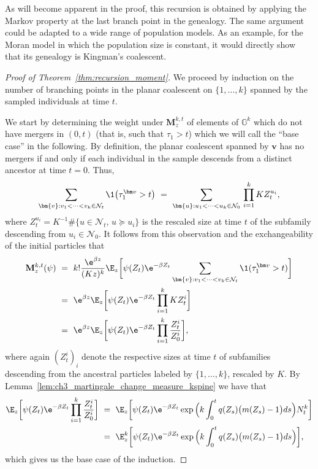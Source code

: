 \begin{refsegment}
\begin{rem}
    As will become apparent in the proof, this recursion is
    obtained by applying the Markov property at the last branch point in
    the genealogy. The same argument could be adapted to a wide range of
    population models. As an example, for the Moran model in which the
    population size is constant, it would directly show that  its
    genealogy is Kingman's coalescent.
\end{rem}

\begin{proof}[Proof of Theorem~\ref{thm:recursion_moment}]
We proceed by induction on the number of branching points in the planar
coalescent on $\{1,\ldots, k\}$ spanned by the sampled individuals at time $t$.

We start by
determining the weight under $\mathbf{M}^{k,t}_{z}$ of elements of $\mathbb{G}^k$ which do not have mergers in $(0,t)$ (that is, such that
$\tau_1>t$) which we will call the ``base case'' in the following. By
definition, the planar coalescent spanned by $\bm v$ has no mergers if
and only if each individual in the sample descends from a distinct
ancestor at time $t=0$. Thus,
\begin{equation*}
    \sum_{\bm{v}:v_1<\cdots < v_k \in \mathcal{N}_t}\1\big( \tau_1^{\bm v}>t\big)\ =\ \sum_{\bm{u}:u_1<\cdots<u_k\in\mathcal{N}_0}\, \prod_{i=1}^k K Z^{u_i}_t ,
\end{equation*}
where $Z^{u_i}_t=K^{-1}\#\big\{ u\in \mathcal{N}_t,\,u\succcurlyeq u_i
\big\}$ is the rescaled size at time $t$ of the subfamily descending from
$u_i\in\mathcal{N}_0$. It follows from this observation and the
exchangeability of the initial particles that
\begin{equation*}
    \begin{aligned}
\mathbf{M}^{k,t}_{z}(\psi)\ &=\ k!\frac{\e^{\beta z}}{(Kz)^k}\E_{z}\bigg[ \psi(Z_t) \e^{-\beta Z_t}\sum_{\bm{v}:v_1<\cdots < v_k \in \mathcal{N}_t}\1( \tau_1^{\bm v}>t)\bigg]\\
&=\  \e^{\beta z}\E_{z}\bigg[\psi(Z_t)\e^{-\beta Z_t}\prod_{i=1}^k K Z^{i}_t\bigg]\\
&=\ \e^{\beta z}\E_{z}\bigg[\psi(Z_t)\e^{-\beta Z_t}\prod_{i=1}^k \frac{Z^{i}_t}{Z^i_0}\bigg],
    \end{aligned}
\end{equation*}
where again $(Z^{i}_t)_i$ denote the respective sizes at time $t$ of subfamilies descending from the ancestral particles labeled by $\{1,\ldots, k\}$, rescaled by $K$. 
By Lemma~\ref{lem:ch3_martingale_change_measure_kspine} we have that
\begin{align*}
    \E_{z}\bigg[\psi(Z_t)\e^{-\beta Z_t}\prod_{i=1}^k \frac{Z^{i}_t}{Z^i_0} \bigg]\ &=\ \E_{z}\bigg[\psi(Z_t)\e^{-\beta Z_t}\exp\Big(k\int_0^t q(Z_s)\big(m(Z_s)-1\big)ds\Big) N^k_t \bigg]\\
   &=\ \E^k_{z}\bigg[\psi(Z_t)\e^{-\beta Z_t}\exp\Big(k\int_0^t q(Z_s)\big(m(Z_s)-1\big)ds\Big)\bigg],
\end{align*}
which gives us the base case of the induction.
\medskip


\end{proof}
\end{refsegment}
